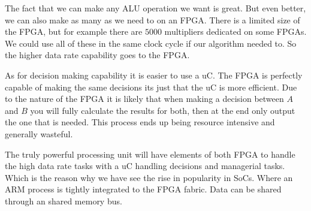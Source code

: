 The fact that we can make any \ac{ALU} operation we want is great. But even better, we can also make as many as we need to on an \ac{FPGA}. There is a limited size of the \ac{FPGA}, but for example there are $5000$ multipliers dedicated on some \ac{FPGA}s. We could use all of these in the same clock cycle if our algorithm needed to. So the higher data rate capability goes to the \ac{FPGA}.

As for decision making capability it is easier to use a \ac{uC}. The \ac{FPGA} is perfectly capable of making the same decisions its just that the \ac{uC} is more efficient. Due to the nature of the \ac{FPGA} it is likely that when making a decision between $A$ and $B$ you will fully calculate the results for both, then at the end only output the one that is needed. This process ends up being resource intensive and generally wasteful.

The truly powerful processing unit will have elements of both \ac{FPGA} to handle the high data rate tasks with a \ac{uC} handling decisions and managerial tasks. Which is the reason why we have see the rise in popularity in \ac{SoC}s. Where an \ac{ARM} process is tightly integrated to the \ac{FPGA} fabric. Data can be shared through an shared memory bus.

